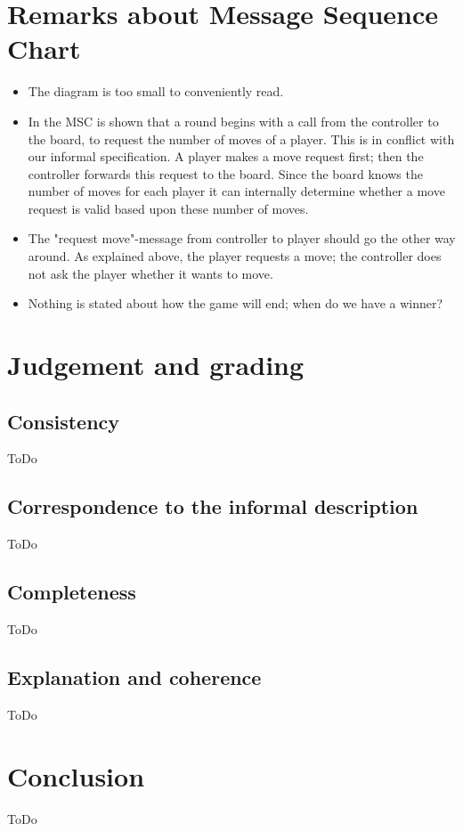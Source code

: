 \documentclass[a4paper,11pt]{article}
\begin{document}
    \section{Remarks about Message Sequence Chart}
    \begin{itemize}
        \item The diagram is too small to conveniently read.
        \item In the MSC is shown that a round begins with a call from the controller to the board, to request the number of moves of a player. This is in conflict with our informal specification. A player makes a move request first; then the controller forwards this request to the board. Since the board knows the number of moves for each player it can internally determine whether a move request is valid based upon these number of moves.
        \item The "request move"-message from controller to player should go the other way around. As explained above, the player requests a move; the controller does not ask the player whether it wants to move.
        \item Nothing is stated about how the game will end; when do we have a winner?
    \end{itemize}


    \section{Judgement and grading}
    \subsection{Consistency}
    ToDo

    \subsection{Correspondence to the informal description}
    ToDo

    \subsection{Completeness}
    ToDo

    \subsection{Explanation and coherence}
    ToDo

    \section{Conclusion}
    ToDo
\end{document}
